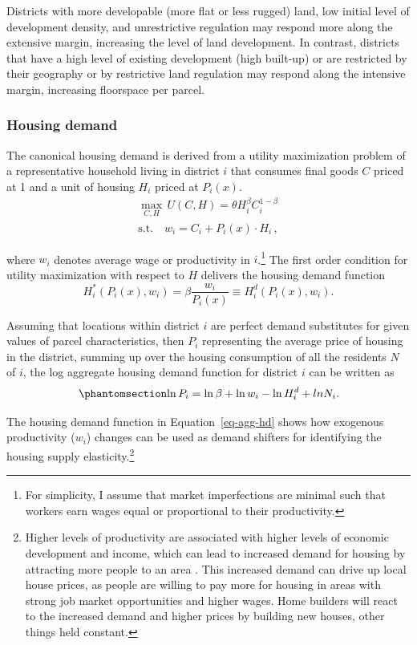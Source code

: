 \documentclass[
  12pt,
]{article}
\begin{document}
Districts with more developable (more flat or less rugged) land, low
initial level of development density, and unrestrictive regulation may
respond more along the extensive margin, increasing the level of land
development. In contrast, districts that have a high level of existing
development (high built-up) or are restricted by their geography or by
restrictive land regulation may respond along the intensive margin,
increasing floorspace per parcel.

\subsubsection{Housing demand}\label{housing-demand}

The canonical housing demand is derived from a utility maximization
problem of a representative household living in district \(i\) that
consumes final goods \(C\) priced at 1 and a unit of housing \(H_i\)
priced at \(P_i(x)\). \[
\begin{aligned}
\underset{C,H}{\max}\, U(C, H) = \theta H_i^\beta C_i^{1-\beta}\\
\text{s.t.}\quad w_i = C_i+P_i(x)\cdot H_i\,,
\end{aligned}
\]

where \(w_i\) denotes average wage or productivity in \(i\).\footnote{For
  simplicity, I assume that market imperfections are minimal such that
  workers earn wages equal or proportional to their productivity.} The
first order condition for utility maximization with respect to \(H\)
delivers the housing demand function \[
H^{*}_i(P_i(x), w_i) = \beta\frac{w_i}{P_i(x)} \equiv H^d_i(P_i(x), w_i).
\]

Assuming that locations within district \(i\) are perfect demand
substitutes for given values of parcel characteristics, then \(P_{i}\)
representing the average price of housing in the district, summing up
over the housing consumption of all the residents \(N\) of \(i\), the
log aggregate housing demand function for district \(i\) can be written
as \begin{equation}\phantomsection\label{eq-agg-hd}{
\ln P_{i}=\ln \beta + \ln w_{i}-\ln H_{i}^{d} + ln N_{i}. 
}\end{equation}

The housing demand function in Equation~\ref{eq-agg-hd} shows how
exogenous productivity (\(w_i\)) changes can be used as demand shifters
for identifying the housing supply elasticity.\footnote{Higher levels of
  productivity are associated with higher levels of economic development
  and income, which can lead to increased demand for housing by
  attracting more people to an area
  \citep{glaeser_gottlieb_2009, glaeser_2008}. This increased demand can
  drive up local house prices, as people are willing to pay more for
  housing in areas with strong job market opportunities and higher
  wages. Home builders will react to the increased demand and higher
  prices by building new houses, other things held constant.}
\end{document}
